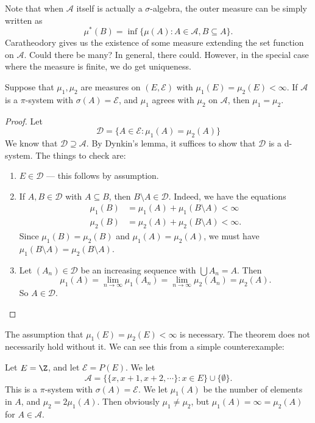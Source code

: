 \documentclass[a4paper]{article}
\begin{document}
Note that when $\mathcal{A}$ itself is actually a $\sigma$-algebra, the outer measure can be simply written as
\[
  \mu^*(B) = \inf \{\mu(A): A \in \mathcal{A}, B \subseteq A\}.
\]
Caratheodory gives us the existence of some measure extending the set function on $\mathcal{A}$. Could there be many? In general, there could. However, in the special case where the measure is finite, we do get uniqueness.
\begin{thm}
  Suppose that $\mu_1, \mu_2$ are measures on $(E, \mathcal{E})$ with $\mu_1(E) = \mu_2(E) < \infty$. If $\mathcal{A}$ is a $\pi$-system with $\sigma(A) = \mathcal{E}$, and $\mu_1$ agrees with $\mu_2$ on $\mathcal{A}$, then $\mu_1 = \mu_2$.
\end{thm}

\begin{proof}
  Let
  \[
    \mathcal{D} = \{A \in \mathcal{E}: \mu_1(A) = \mu_2(A)\}
  \]
  We know that $\mathcal{D} \supseteq \mathcal{A}$. By Dynkin's lemma, it suffices to show that $\mathcal{D}$ is a d-system. The things to check are:
  \begin{enumerate}
    \item $E \in \mathcal{D}$ --- this follows by assumption.
    \item If $A, B \in \mathcal{D}$ with $A \subseteq B$, then $B \setminus A \in \mathcal{D}$. Indeed, we have the equations
      \begin{align*}
        \mu_1(B) &= \mu_1(A) + \mu_1(B \setminus A) < \infty\\
        \mu_2(B) &= \mu_2(A) + \mu_2(B \setminus A) < \infty.
      \end{align*}
      Since $\mu_1(B) = \mu_2(B)$ and $\mu_1(A) = \mu_2(A)$, we must have $\mu_1(B \setminus A) = \mu_2(B \setminus A)$.
    \item Let $(A_n) \in \mathcal{D}$ be an increasing sequence with $\bigcup A_n = A$. Then
      \[
        \mu_1(A) = \lim_{n \to \infty}\mu_1(A_n) = \lim_{n \to \infty} \mu_2(A_n) = \mu_2(A).
      \]
      So $A \in\mathcal{D}$.
  \end{enumerate}
\end{proof}
The assumption that $\mu_1(E) = \mu_2(E) < \infty$ is necessary. The theorem does not necessarily hold without it. We can see this from a simple counterexample:

\begin{eg}
  Let $E = \Z$, and let $\mathcal{E} = P(E)$. We let
  \[
    \mathcal{A} = \{\{x, x+1, x+2, \cdots\}: x \in E\} \cup \{\emptyset\}.
  \]
  This is a $\pi$-system with $\sigma(A) = \mathcal{E}$. We let $\mu_1(A)$ be the number of elements in $A$, and $\mu_2 = 2\mu_1(A)$. Then obviously $\mu_1 \not= \mu_2$, but $\mu_1(A) = \infty = \mu_2(A)$ for $A \in \mathcal{A}$.
\end{eg}
\end{document}
